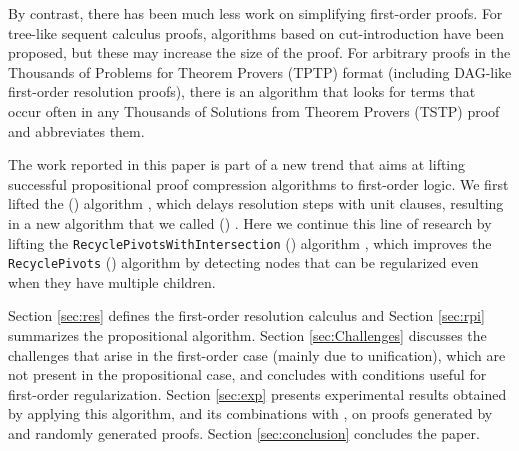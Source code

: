 By contrast, there has been much less work on simplifying first-order proofs. 
For tree-like sequent calculus proofs, algorithms based on cut-introduction \cite{BrunoLPAR,Hetzl} have been proposed, but these may increase the size of the proof. 
For arbitrary proofs in the Thousands of Problems for Theorem Provers (TPTP) \cite{TPTP} format (including DAG-like first-order resolution proofs), there is an algorithm \cite{LPARCzech} that looks for terms that occur often in any Thousands of Solutions from Theorem Provers (TSTP) \cite{TPTP} proof and abbreviates them. 


The work reported in this paper is part of a new trend that aims at lifting successful propositional proof compression algorithms to first-order logic. %
We first lifted the {\LowerUnits} ({\LU}) algorithm \cite{LURPI}, which delays resolution steps with unit clauses, resulting in a new algorithm that we called
{\SFOLowerUnits} 
({\GFOLU}) \cite{GFOLU}. Here we continue this line of research by lifting the 
\texttt{Recycle\-PivotsWithIntersection}
({\RPI}) algorithm \cite{LURPI}, which improves the \texttt{RecyclePivots} ({\RP}) algorithm \cite{RP08} by detecting nodes that can be regularized even when they have multiple children. 


Section \ref{sec:res} defines the first-order resolution calculus and Section \ref{sec:rpi} summarizes the propositional {\RPI} algorithm. Section \ref{sec:Challenges} discusses the challenges that arise in the first-order case (mainly due to unification), which are not present in the propositional case, and concludes with conditions useful for first-order regularization. Section \ref{sec:exp} presents experimental results obtained by applying this algorithm, and its combinations with {\GFOLU}, on proofs generated by {\SPASS} and randomly generated proofs. Section \ref{sec:conclusion} concludes the paper.



